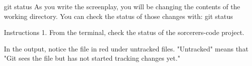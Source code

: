 git status
    As you write the screenplay, you will be changing the contents of the working directory. You can check the status of those changes with:
        git status

Instructions
    1.
    From the terminal, check the status of the sorcerers-code project.

    In the output, notice the file in red under untracked files. "Untracked" means that "Git sees the file but has not started tracking changes yet."